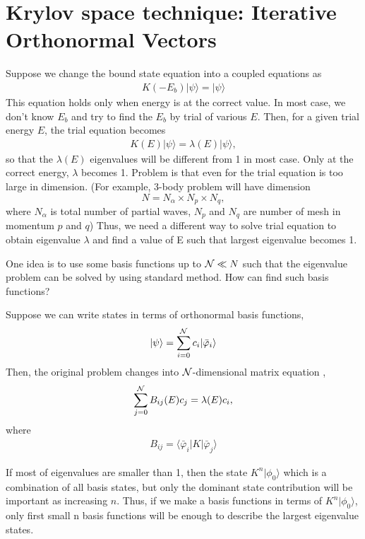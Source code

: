 \documentclass[11pt]{article}
\newcommand{\bea}{\begin{eqnarray}}
\newcommand{\eea}{\end{eqnarray}}
\newcommand{\la}{\langle}
\newcommand{\ra}{\rangle}
\begin{document}
\section{Krylov space technique: Iterative Orthonormal Vectors}
Suppose we change the bound state equation into a coupled equations as
\bea 
K(-E_b)|\psi\ra=|\psi\ra  
\eea 
This equation holds only when energy is at the correct value.
In most case, we don't know $E_b$ and try to find the $E_b$ by 
trial of various $E$. Then, for a given trial energy $E$, 
the trial equation becomes
\bea 
K(E)|\psi\ra=\lambda(E)|\psi\ra,  
\eea 
so that the $\lambda(E)$ eigenvalues will be different from 1 in most case. 
Only at the correct energy, $\lambda$ becomes 1. 
Problem is that even for the trial equation is too large in dimension. 
(For example, 3-body problem will have dimension 
$$N=N_\alpha\times N_p\times N_q ,$$
where $N_\alpha$ is total number of partial waves, $N_p$ and $N_q$ are
number of mesh in momentum $p$ and $q$)
Thus, we need a different way to solve trial equation to obtain 
eigenvalue $\lambda$ and find a value of E such that largest eigenvalue becomes 1.

One idea is to use some basis functions up to ${\cal N}\ll N$ such that 
the eigenvalue problem can be solved by using standard method. 
How can find such basis functions? 

Suppose we can write states in terms of orthonormal basis functions,
\bea 
|\psi\ra =\sum_{i=0}^{\cal N} c_i |\bar{\varphi}_i\ra 
\eea 
Then, the original problem changes into  ${\cal N}$-dimensional matrix equation ,
\bea 
\sum_{j=0}^{\cal N} B_{ij}(E) c_j=\lambda(E) c_i,
\eea 
where
\bea 
B_{ij}=\la \bar{\varphi}_i|K|\bar{\varphi}_j\ra 
\eea 

If most of eigenvalues are smaller than 1, then the state $K^n|\phi_0\ra $
which is a combination of all basis states, but only the dominant state contribution
will be important as increasing $n$. Thus, if we make a basis functions
in terms of $K^n|\phi_0\ra$, only first small n basis functions will be enough
to describe the largest eigenvalue states.
\end{document}
